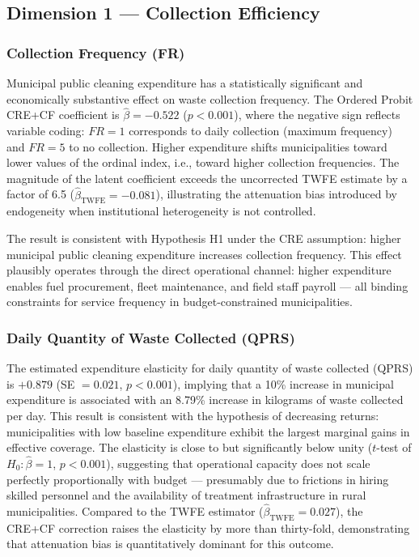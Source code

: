 \subsection{Dimension 1 --- Collection Efficiency}
\label{sec:d1}

\subsubsection*{Collection Frequency (FR)}

Municipal public cleaning expenditure has a statistically significant and economically substantive effect on waste collection frequency. The Ordered Probit CRE+CF coefficient is $\hat{\beta} = -0.522$ ($p < 0.001$), where the negative sign reflects variable coding: $FR = 1$ corresponds to daily collection (maximum frequency) and $FR = 5$ to no collection. Higher expenditure shifts municipalities toward lower values of the ordinal index, i.e., toward higher collection frequencies. The magnitude of the latent coefficient exceeds the uncorrected TWFE estimate by a factor of 6.5 ($\hat{\beta}_{\text{TWFE}} = -0.081$), illustrating the attenuation bias introduced by endogeneity when institutional heterogeneity is not controlled.

The result is consistent with Hypothesis H1 under the CRE assumption: higher municipal public cleaning expenditure increases collection frequency. This effect plausibly operates through the direct operational channel: higher expenditure enables fuel procurement, fleet maintenance, and field staff payroll --- all binding constraints for service frequency in budget-constrained municipalities.

\subsubsection*{Daily Quantity of Waste Collected (QPRS)}

The estimated expenditure elasticity for daily quantity of waste collected (QPRS) is $+0.879$ (SE $= 0.021$, $p < 0.001$), implying that a 10\% increase in municipal expenditure is associated with an 8.79\% increase in kilograms of waste collected per day. This result is consistent with the hypothesis of decreasing returns: municipalities with low baseline expenditure exhibit the largest marginal gains in effective coverage. The elasticity is close to but significantly below unity ($t$-test of $H_0: \hat{\beta} = 1$, $p < 0.001$), suggesting that operational capacity does not scale perfectly proportionally with budget --- presumably due to frictions in hiring skilled personnel and the availability of treatment infrastructure in rural municipalities. Compared to the TWFE estimator ($\hat{\beta}_{\text{TWFE}} = 0.027$), the CRE+CF correction raises the elasticity by more than thirty-fold, demonstrating that attenuation bias is quantitatively dominant for this outcome.

